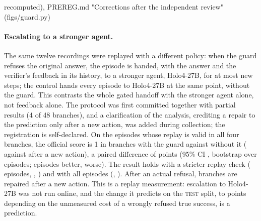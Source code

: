 recomputed), PREREG.md "Corrections after the independent review" (figs/guard.py)

\paragraph{Escalating to a stronger agent.} The same twelve recordings were replayed with a different policy: when the guard refuses the original answer, the episode is handed, with the answer and the verifier's feedback in its history, to a stronger agent, Holo4-27B, for at most \rbMaxNew{} new steps; the control hands every episode to Holo4-27B at the same point, without the guard. This contrasts the whole gated handoff with the stronger agent alone, not feedback alone. The protocol was first committed together with partial results (4 of 48 branches), and a clarification of the analysis, crediting a repair to the prediction only after a new action, was added during collection; the registration is self-declared. On the \rbPrimEpisodes{} episodes whose replay is valid in all four branches, the official score is 1 in \rbGuardSucc{} branches with the guard against \rbCtrlSucc{} without it (\rbGuardAfterAction{} against \rbCtrlAfterAction{} after a new action), a paired difference of \rbPrimDiff{} points (95\% CI \rbPrimDiffCi, bootstrap over episodes; \rbBetter{} episodes better, \rbWorse{} worse). The result holds with a stricter replay check (\rbStrictEpisodes{} episodes, \rbStrictDiff, \rbStrictDiffCi) and with all \rbAllEpisodes{} episodes (\rbAllDiff, \rbAllDiffCi). After an actual refusal, \rbRefRepaired{} branches are repaired after a new action. This is a replay measurement: escalation to Holo4-27B was not run online, and the change it predicts on the \textsc{test} split, \rbPredLo{} to \rbPredHi{} points depending on the unmeasured cost of a wrongly refused true success, is a prediction. %
